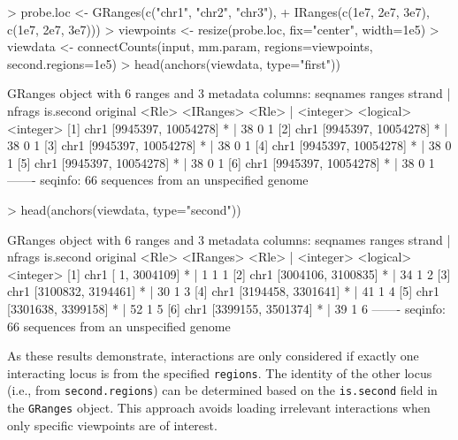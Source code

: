 \documentclass[12pt]{report}
\renewenvironment{Schunk}{\vspace{0pt}}{\vspace{0pt}}
\newcommand{\code}[1]{{\small\texttt{#1}}}
\begin{document}
\begin{Schunk}
\begin{Sinput}
> probe.loc <- GRanges(c("chr1", "chr2", "chr3"),
+     IRanges(c(1e7, 2e7, 3e7), c(1e7, 2e7, 3e7)))
> viewpoints <- resize(probe.loc, fix="center", width=1e5)
> viewdata <- connectCounts(input, mm.param, regions=viewpoints, second.regions=1e5)
> head(anchors(viewdata, type="first"))
\end{Sinput}
\begin{Soutput}
GRanges object with 6 ranges and 3 metadata columns:
      seqnames              ranges strand |    nfrags is.second  original
         <Rle>           <IRanges>  <Rle> | <integer> <logical> <integer>
  [1]     chr1 [9945397, 10054278]      * |        38         0         1
  [2]     chr1 [9945397, 10054278]      * |        38         0         1
  [3]     chr1 [9945397, 10054278]      * |        38         0         1
  [4]     chr1 [9945397, 10054278]      * |        38         0         1
  [5]     chr1 [9945397, 10054278]      * |        38         0         1
  [6]     chr1 [9945397, 10054278]      * |        38         0         1
  -------
  seqinfo: 66 sequences from an unspecified genome
\end{Soutput}
\begin{Sinput}
> head(anchors(viewdata, type="second"))
\end{Sinput}
\begin{Soutput}
GRanges object with 6 ranges and 3 metadata columns:
      seqnames             ranges strand |    nfrags is.second  original
         <Rle>          <IRanges>  <Rle> | <integer> <logical> <integer>
  [1]     chr1 [      1, 3004109]      * |         1         1         1
  [2]     chr1 [3004106, 3100835]      * |        34         1         2
  [3]     chr1 [3100832, 3194461]      * |        30         1         3
  [4]     chr1 [3194458, 3301641]      * |        41         1         4
  [5]     chr1 [3301638, 3399158]      * |        52         1         5
  [6]     chr1 [3399155, 3501374]      * |        39         1         6
  -------
  seqinfo: 66 sequences from an unspecified genome
\end{Soutput}
\end{Schunk}

As these results demonstrate, interactions are only considered if exactly one interacting locus is from the specified \code{regions}.
The identity of the other locus (i.e., from \code{second.regions}) can be determined based on the \code{is.second} field in the \code{GRanges} object.
This approach avoids loading irrelevant interactions when only specific viewpoints are of interest.
\end{document}
